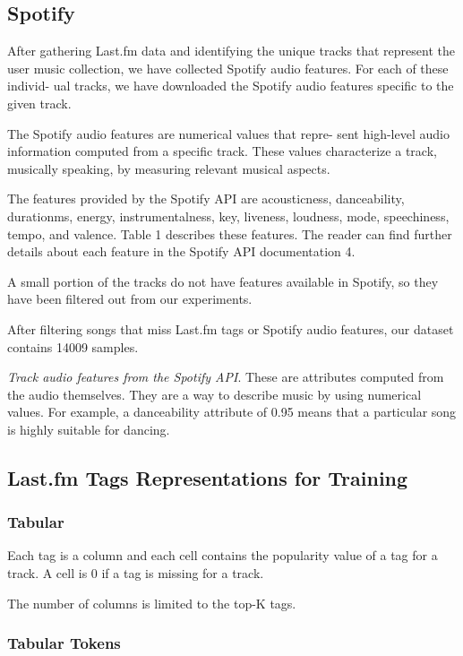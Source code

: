 \documentclass[sn-mathphys]{sn-jnl}%
\theoremstyle{thmstyleone}%
\theoremstyle{thmstyletwo}%
\theoremstyle{thmstylethree}%
\begin{document}
\subsection{Spotify}

After gathering Last.fm data and identifying the unique
tracks that represent the user music collection, we have
collected Spotify audio features. For each of these individ-
ual tracks, we have downloaded the Spotify audio features
specific to the given track.

The Spotify audio features are numerical values that repre-
sent high-level audio information computed from a specific
track. These values characterize a track, musically speaking,
by measuring relevant musical aspects.

The features provided by the Spotify API are acousticness,
danceability, duration\textunderscore ms, energy, instrumentalness, key,
liveness, loudness, mode, speechiness, tempo, and valence.
Table 1 describes these features. The reader can find further
details about each feature in the Spotify API documentation
4.

A small portion of the tracks do not have features available in
Spotify, so they have been filtered out from our experiments.

After filtering songs that miss Last.fm tags or Spotify audio features,
our dataset contains 14009 samples.

\emph{Track audio features from the Spotify API}. These are
attributes computed from the audio themselves. They
are a way to describe music by using numerical values.
For example, a danceability attribute of 0.95 means
that a particular song is highly suitable for dancing.

\subsection{Last.fm Tags Representations for Training}


\subsubsection{Tabular}
Each tag is a column and each cell contains the popularity value of a tag for a track.
A cell is 0 if a tag is missing for a track.

The number of columns is limited to the top-K tags.

\subsubsection{Tabular Tokens}
\end{document}
